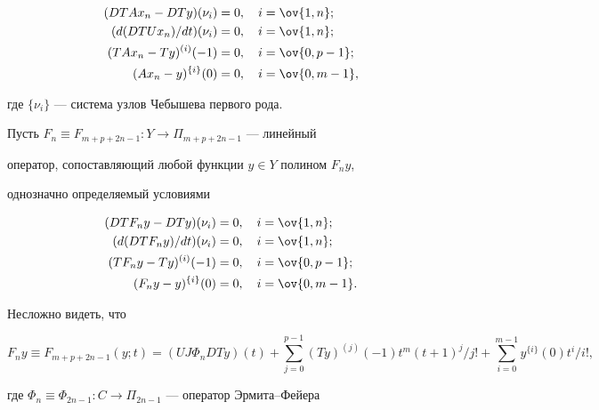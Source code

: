 \begin{equation} 


\begin{split} 


(D T A x_n-D T y)(\nu_i)&=0,\quad i=\ov{1,n};\\ 


(d(D T U x_n)/d t)(\nu_i)&=0,\quad i=\ov{1,n};\\ 


(T A x_n-T y)^{(i)}(-1)&=0,\quad i=\ov{0,p-1};\\ 


(A x_n-y)^{\{i\}}(0)&=0,\quad i=\ov{0,m-1}, 


\end{split} 


\end{equation} 


где $\{\nu_i\}$ --- система узлов Чебышева первого рода. 


 


Пусть $F_n\equiv F_{m+p+2n-1}:Y\to\Pi_{m+p+2n-1}$ --- линейный 


оператор, сопоставляющий любой функции $y\in Y$ полином $F_n y$, 


однозначно определяемый условиями 


\begin{align*} 


(D T F_n y-D T y)(\nu_i)&=0,\quad i=\ov{1,n};\\ 


(d(D T F_n y)/d t)(\nu_i)&=0,\quad i=\ov{1,n};\\ 


(T F_n y-T y)^{(i)}(-1)&=0,\quad i=\ov{0,p-1};\\ 


(F_n y-y)^{\{i\}}(0)&=0,\quad i=\ov{0,m-1}. 


\end{align*} 


Несложно видеть, что 


\begin{equation} 


F_n y\equiv F_{m+p+2n-1}(y;t)=(U J\Phi_n D T y)(t)+ 


\sum^{p-1}_{j=0}(T y)^{(j)}(-1)t^m(t+1)^j/j!+\sum^{m-1}_{i=0} 


y^{\{i\}}(0)t^i/i!, 


\end{equation} 


где $\Phi_n\equiv\Phi_{2n-1}:C\to\Pi_{2n-1}$ --- оператор Эрмита--Фейера 


